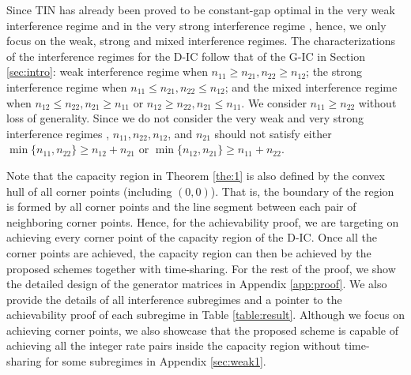 \documentclass[12pt, draftclsnofoot, onecolumn]{IEEEtran}
\theoremstyle{definition}
\begin{document}
Since TIN has already been proved to be constant-gap optimal in the very weak interference regime \cite{7051266} and in the very strong interference regime \cite{7451210}, hence, we only focus on the weak, strong and mixed interference regimes. The characterizations of the interference regimes for the D-IC follow that of the G-IC in Section \ref{sec:intro}: weak interference regime when $n_{11}\geq n_{21},n_{22}\geq n_{12}$; the strong interference regime when $n_{11}\leq n_{21},n_{22}\leq n_{12}$; and the mixed interference regime when $n_{12}\leq n_{22},n_{21}\geq n_{11}$ or $n_{12}\geq n_{22},n_{21}\leq n_{11}$. We consider $n_{11}\geq n_{22}$ without loss of generality. Since we do not consider the very weak \cite{7051266} and very strong interference regimes \cite{1056416}, $n_{11},n_{22},n_{12}$, and $n_{21}$ should not satisfy either $\min\{n_{11},n_{22}\}\geq n_{12}+n_{21}$ or $\min\{n_{12},n_{21}\}\geq n_{11}+n_{22}$.


Note that the capacity region in Theorem \ref{the:1} is also defined by the convex hull of all corner points (including $(0,0)$). That is, the boundary of the region is formed by all corner points and the line segment between each pair of neighboring corner points. Hence, for the achievability proof, we are targeting on achieving every corner point of the capacity region of the D-IC. Once all the corner points are achieved, the capacity region can then be achieved by the proposed schemes together with time-sharing. For the rest of the proof, we show the detailed design of the generator matrices in Appendix \ref{app:proof}. We also provide the details of all interference subregimes and a pointer to the achievability proof of each subregime in Table \ref{table:result}. Although we focus on achieving corner points, we also showcase that the proposed scheme is capable of achieving all the integer rate pairs inside the capacity region without time-sharing for some subregimes in Appendix \ref{sec:weak1}.
\end{document}
